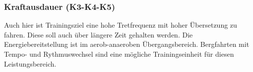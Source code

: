 \subsubsection{Kraftausdauer (K3-K4-K5)}
Auch hier ist Trainingsziel eine hohe Tretfrequenz mit hoher Übersetzung zu fahren. Diese soll auch über längere Zeit gehalten werden. Die Energiebereitstellung ist im aerob-anaeroben Übergangsbereich. Bergfahrten mit Tempo- und Rythmuswechsel sind eine mögliche Trainingseinheit für diesen Leistungsbereich.
